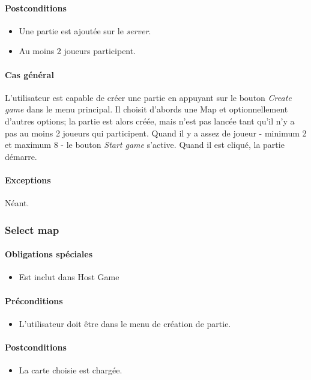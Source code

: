 \documentclass[a4paper,11pt]{report}
\begin{document}
\paragraph{Postconditions}
\begin{itemize}
 \item Une partie est ajoutée sur le \textit{server}.
 \item Au moins 2 joueurs participent.
\end{itemize}
\paragraph{Cas général}
L'utilisateur est capable de créer une partie en appuyant sur le bouton \og \textit{Create game} \fg dans le menu principal.
Il choisit d'abords une Map et optionnellement d'autres options; la partie est alors créée, mais n'est pas lancée tant qu'il n'y a pas au moins 2 joueurs qui participent.
Quand il y a assez de joueur - minimum 2 et maximum 8 - le bouton \og \textit{Start game} \fg s'active. Quand il est cliqué, la partie démarre.
\paragraph{Exceptions} Néant.

\newpage
\subsubsection{Select map}
\paragraph{Obligations spéciales}
\begin{itemize}
 \item Est inclut dans Host Game
\end{itemize}
\paragraph{Préconditions}
\begin{itemize}
 \item L'utilisateur doit être dans le menu de création de partie.
\end{itemize}
\paragraph{Postconditions}
\begin{itemize}
 \item La carte choisie est chargée.
\end{itemize}
\end{document}
